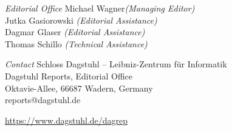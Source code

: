 \documentclass[a4paper,USenglish]{dagrep-master-v2021}
\begin{document}
\begin{publicationinfo}
\medskip
\emph{Editorial Office}\newline
Michael Wagner\emph{(Managing Editor)}\\
Jutka Gasiorowski \emph{(Editorial Assistance)}\\
Dagmar Glaser \emph{(Editorial Assistance)}\\
Thomas Schillo \emph{(Technical Assistance)}

\medskip
\emph{Contact}\newline
Schloss Dagstuhl -- Leibniz-Zentrum f\"ur Informatik\\
Dagstuhl Reports, Editorial Office\\
Oktavie-Allee, 66687 Wadern, Germany\\ 
reports@dagstuhl.de


\vfill

\href{https://www.dagstuhl.de/dagrep}{https://www.dagstuhl.de/dagrep}

  
\end{publicationinfo}
\end{document}

